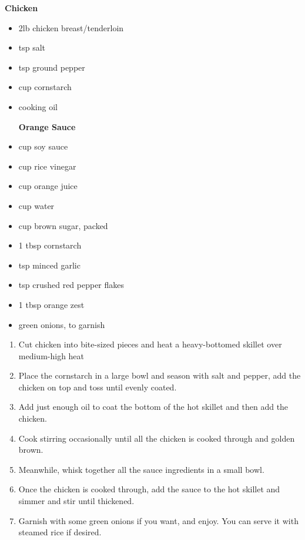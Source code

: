 



\begin{multicols}{2}
\textbf{Chicken}
\raggedcolumns 
\begin{itemize}
    \item 2lb chicken breast/tenderloin
    \item {} tsp salt
    \item {} tsp ground pepper
    \item {} cup cornstarch
    \item {} cooking oil
    
    \columnbreak
    
    \textbf{Orange Sauce}
    
    \item {} cup soy sauce
    \item {} cup rice vinegar
    \item {} cup orange juice
    \item {} cup water
    \item {} cup brown sugar, packed
    \item 1 tbsp cornstarch
    \item {} tsp minced garlic
    \item {} tsp crushed red pepper flakes
    \item 1 tbsp orange zest
    \item green onions, to garnish
\end{itemize}
\end{multicols}

\instructions
\begin{enumerate}
    \item Cut chicken into bite-sized pieces and heat a heavy-bottomed skillet over medium-high heat
    \item Place the cornstarch in a large bowl and season with salt and pepper, add the chicken on top and toss until evenly coated.
    \item Add just enough oil to coat the bottom of the hot skillet and then add the chicken.
    \item Cook stirring occasionally until all the chicken is cooked through and golden brown.
    \item Meanwhile, whisk together all the sauce ingredients in a small bowl.
    \item Once the chicken is cooked through, add the sauce to the hot skillet and simmer and stir until thickened.
    \item Garnish with some green onions if you want, and enjoy. You can serve it with steamed rice if desired.

    
\end{enumerate}

